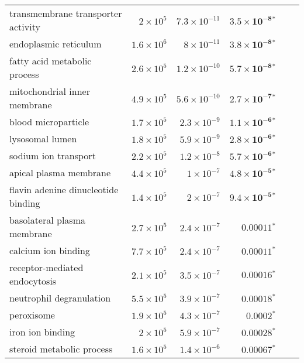 \documentclass{article}
\begin{document}
\begin{longtable}{|l|r|r|r|r|r|}
        transmembrane transporter activity &  $ 2\times 10^{5}$ & $7.3\times 10^{-11}$ &   $\bm{3.5\times 10^{-8}{^*}}$ \\
                     endoplasmic reticulum & $1.6\times 10^{6}$ &  $ 8\times 10^{-11}$ &   $\bm{3.8\times 10^{-8}{^*}}$ \\
              fatty acid metabolic process & $2.6\times 10^{5}$ & $1.2\times 10^{-10}$ &   $\bm{5.7\times 10^{-8}{^*}}$ \\
              mitochondrial inner membrane & $4.9\times 10^{5}$ & $5.6\times 10^{-10}$ &   $\bm{2.7\times 10^{-7}{^*}}$ \\
                       blood microparticle & $1.7\times 10^{5}$ &  $2.3\times 10^{-9}$ &   $\bm{1.1\times 10^{-6}{^*}}$ \\
                           lysosomal lumen & $1.8\times 10^{5}$ &  $5.9\times 10^{-9}$ &   $\bm{2.8\times 10^{-6}{^*}}$ \\
                      sodium ion transport & $2.2\times 10^{5}$ &  $1.2\times 10^{-8}$ &   $\bm{5.7\times 10^{-6}{^*}}$ \\
                    apical plasma membrane & $4.4\times 10^{5}$ &   $ 1\times 10^{-7}$ &   $\bm{4.8\times 10^{-5}{^*}}$ \\
       flavin adenine dinucleotide binding & $1.4\times 10^{5}$ &   $ 2\times 10^{-7}$ &   $\bm{9.4\times 10^{-5}{^*}}$ \\
               basolateral plasma membrane & $2.7\times 10^{5}$ &  $2.4\times 10^{-7}$ &             $\bm{0.00011{^*}}$ \\
                       calcium ion binding & $7.7\times 10^{5}$ &  $2.4\times 10^{-7}$ &             $\bm{0.00011{^*}}$ \\
             receptor-mediated endocytosis & $2.1\times 10^{5}$ &  $3.5\times 10^{-7}$ &             $\bm{0.00016{^*}}$ \\
                  neutrophil degranulation & $5.5\times 10^{5}$ &  $3.9\times 10^{-7}$ &             $\bm{0.00018{^*}}$ \\
                                peroxisome & $1.9\times 10^{5}$ &  $4.3\times 10^{-7}$ &              $\bm{0.0002{^*}}$ \\
                          iron ion binding &  $ 2\times 10^{5}$ &  $5.9\times 10^{-7}$ &             $\bm{0.00028{^*}}$ \\
                 steroid metabolic process & $1.6\times 10^{5}$ &  $1.4\times 10^{-6}$ &             $\bm{0.00067{^*}}$ \\

\end{longtable}
\end{document}
